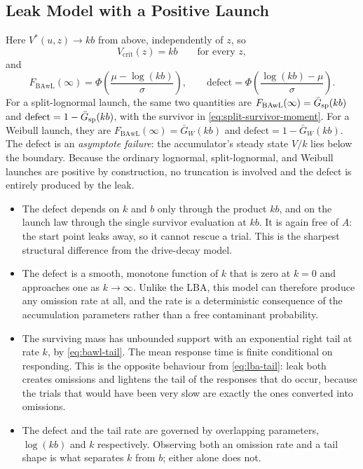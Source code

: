 \documentclass[12pt]{article}
\newcommand{\PhiN}{\Phi}
\newcommand{\Gbar}{\bar{G}}
\theoremstyle{remark}
\begin{document}
\subsection{Leak Model with a Positive Launch}
Here $V^{*}(u,z) \to kb$ from above, independently of $z$, so
\begin{equation}
  V_{\mathrm{crit}}(z) = kb
  \qquad\text{for every } z,
\end{equation}
and
\begin{equation}
  F_{\mathrm{BAwL}}(\infty) = \PhiN\!\left(\frac{\mu - \log(kb)}{\sigma}\right),
  \qquad
  \text{defect} = \PhiN\!\left(\frac{\log(kb) - \mu}{\sigma}\right).
  \label{eq:bawl-defect}
\end{equation}
For a split-lognormal launch, the same two quantities are $F_{\mathrm{BAwL}}(\infty)=\Gbar_{\rm sp}(kb)$ and $\text{defect}=1-\Gbar_{\rm sp}(kb)$, with the survivor in
\eqref{eq:split-survivor-moment}.
For a Weibull launch, they are $F_{\mathrm{BAwL}}(\infty)=\Gbar_W(kb)$ and $\text{defect}=1-\Gbar_W(kb)$. The defect is an \emph{asymptote failure}: the accumulator's steady state $V/k$ lies below the boundary. Because the ordinary lognormal, split-lognormal, and Weibull launches are positive by construction, no truncation is involved and the defect is entirely produced by the leak.

\begin{itemize}
  \item The defect depends on $k$ and $b$ only through the product $kb$, and on the launch law through the single survivor evaluation at $kb$. It is again free of $A$: the start point leaks away, so it cannot rescue a trial. This is the sharpest structural difference from the drive-decay model.
  \item The defect is a smooth, monotone function of $k$ that is zero at $k = 0$ and approaches one as $k \to \infty$. Unlike the LBA, this model can therefore produce any omission rate at all, and the rate is a deterministic consequence of the accumulation parameters rather than a free contaminant probability.
  \item The surviving mass has unbounded support with an exponential right tail at rate $k$, by \eqref{eq:bawl-tail}. The mean response time is finite conditional on responding. This is the opposite behaviour from
        \eqref{eq:lba-tail}: leak both creates omissions and lightens the tail
        of the responses that do occur, because the trials that would have been very slow are exactly the ones converted into omissions.
  \item The defect and the tail rate are governed by overlapping parameters, $\log(kb)$ and $k$ respectively. Observing both an omission rate and a tail shape is what separates $k$ from $b$; either alone does not.
\end{itemize}
\end{document}
